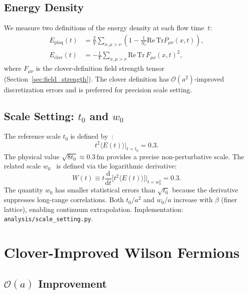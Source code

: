 \documentclass[12pt]{article}
\newcommand{\dd}{\mathrm{d}}
\newcommand{\ReTr}{\mathrm{Re\,Tr}}
\newcommand{\code}[1]{\texttt{#1}}
\begin{document}
\subsection{Energy Density}

We measure two definitions of the energy density at each flow time~$t$:
\begin{align}
\label{eq:energy_plaq}
E_{\mathrm{plaq}}(t) &= \frac{2}{V} \sum_{x, \mu > \nu} \left(1 - \frac{1}{N_c} \ReTr P_{\mu\nu}(x,t)\right), \\
\label{eq:energy_clover}
E_{\mathrm{clov}}(t) &= -\frac{1}{V} \sum_{x, \mu > \nu} \ReTr \, F_{\mu\nu}(x,t)^2,
\end{align}
where $F_{\mu\nu}$ is the clover-definition field strength tensor (Section~\ref{sec:field_strength}). The clover definition has $\mathcal{O}(a^2)$-improved discretization errors and is preferred for precision scale setting.

\subsection{Scale Setting: $t_0$ and $w_0$}

The reference scale $t_0$ is defined by~\cite{Luscher2010}:
\begin{equation}
\label{eq:t0}
t^2 \langle E(t) \rangle \big|_{t = t_0} = 0.3.
\end{equation}
The physical value $\sqrt{8 t_0} \approx 0.3\,\mathrm{fm}$ provides a precise non-perturbative scale. The related scale $w_0$~\cite{BMW2012} is defined via the logarithmic derivative:
\begin{equation}
\label{eq:w0}
W(t) \equiv t \frac{\dd}{\dd t}\big[t^2 \langle E(t) \rangle\big]\bigg|_{t = w_0^2} = 0.3.
\end{equation}
The quantity $w_0$ has smaller statistical errors than $\sqrt{t_0}$ because the derivative suppresses long-range correlations. Both $t_0/a^2$ and $w_0/a$ increase with $\beta$ (finer lattice), enabling continuum extrapolation. Implementation: \code{analysis/scale\_setting.py}.


\section{Clover-Improved Wilson Fermions}
\label{sec:clover}

\subsection{$\mathcal{O}(a)$ Improvement}
\end{document}
